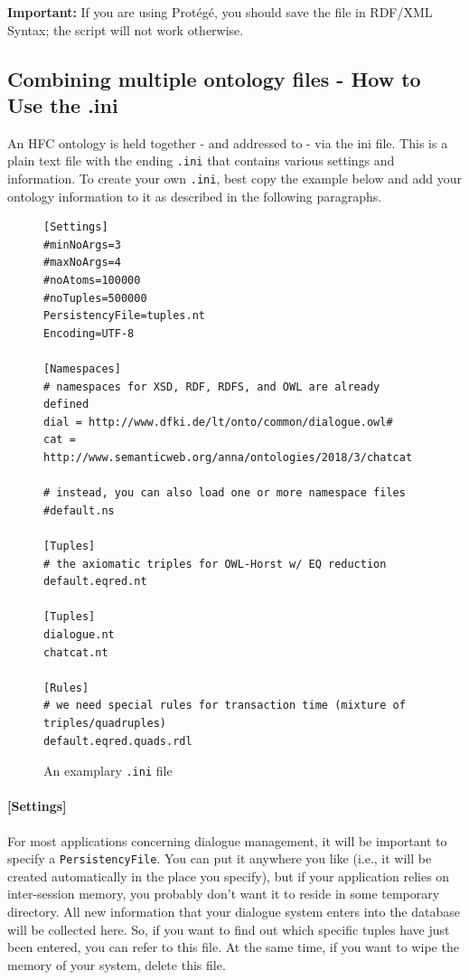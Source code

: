\documentclass[a4paper]{report}
\begin{document}
\textbf{Important:} If you are using Prot\'eg\'e, you should save the file in RDF/XML Syntax; the script will not work otherwise.


\subsection{Combining multiple ontology files - How to Use the .ini}

An HFC ontology is held together - and addressed to - via the ini file. This is a plain text file with the ending \texttt{.ini} that contains various settings and information. To create your own \texttt{.ini}, best copy the example below and add your ontology information to it as described in the following paragraphs.

\begin{figure} [htbp]
\begin{verbatim}
[Settings]
#minNoArgs=3
#maxNoArgs=4
#noAtoms=100000
#noTuples=500000
PersistencyFile=tuples.nt
Encoding=UTF-8

[Namespaces]
# namespaces for XSD, RDF, RDFS, and OWL are already defined
dial = http://www.dfki.de/lt/onto/common/dialogue.owl#
cat = http://www.semanticweb.org/anna/ontologies/2018/3/chatcat

# instead, you can also load one or more namespace files
#default.ns

[Tuples]
# the axiomatic triples for OWL-Horst w/ EQ reduction
default.eqred.nt

[Tuples]
dialogue.nt
chatcat.nt

[Rules]
# we need special rules for transaction time (mixture of triples/quadruples)
default.eqred.quads.rdl
\end{verbatim}
\caption{An examplary \texttt{.ini} file}
\label{fig:ini}
\end{figure}

\paragraph{[Settings]}

For most applications concerning dialogue management, it will be important to specify a \texttt{PersistencyFile}. You can put it anywhere you like (i.e., it will be created automatically in the place you specify), but if your application relies on inter-session memory, you probably don't want it to reside in some temporary directory. All new information that your dialogue system enters into the database will be collected here. So, if you want to find out which specific tuples have just been entered, you can refer to this file. At the same time, if you want to wipe the memory of your system, delete this file.
\end{document}
